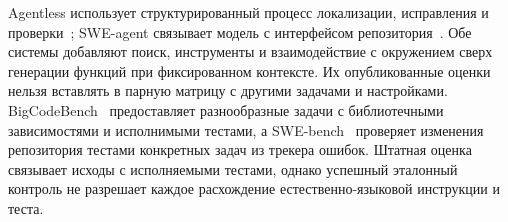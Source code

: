 Agentless использует структурированный процесс локализации, исправления и проверки~\cite{xia2024agentless}; SWE-agent связывает модель с интерфейсом репозитория~\cite{yang2024sweagent}. Обе системы добавляют поиск, инструменты и взаимодействие с окружением сверх генерации функций при фиксированном контексте. Их опубликованные оценки нельзя вставлять в парную матрицу с другими задачами и настройками. BigCodeBench~\cite{zhuo2024bigcodebench} предоставляет разнообразные задачи с библиотечными зависимостями и исполнимыми тестами, а SWE-bench~\cite{jimenez2023swebench,swebenchdocs2026} проверяет изменения репозитория тестами конкретных задач из трекера ошибок. Штатная оценка связывает исходы с исполняемыми тестами, однако успешный эталонный контроль не разрешает каждое расхождение естественно-языковой инструкции и теста.


